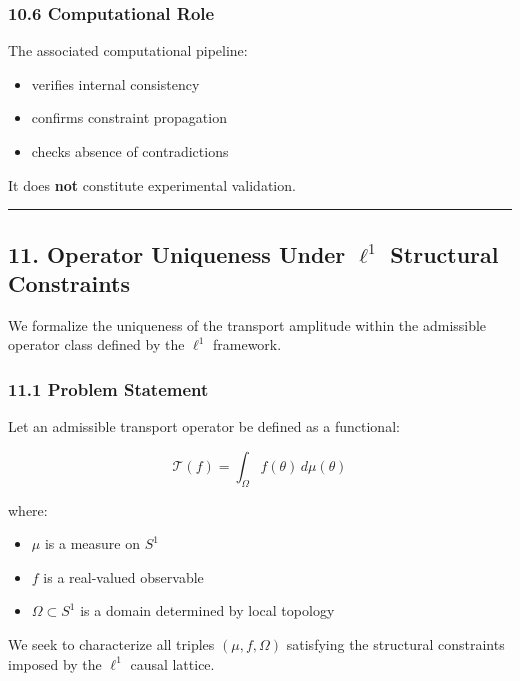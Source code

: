 \documentclass[
]{article}
\providecommand{\tightlist}{%
  \setlength{\itemsep}{0pt}\setlength{\parskip}{0pt}}
\begin{document}
\subsubsection{10.6 Computational Role}\label{computational-role}

The associated computational pipeline:

\begin{itemize}
\tightlist
\item
  verifies internal consistency
\item
  confirms constraint propagation
\item
  checks absence of contradictions
\end{itemize}

It does \textbf{not} constitute experimental validation.

\begin{center}\rule{0.5\linewidth}{0.5pt}\end{center}

\subsection{\texorpdfstring{11. Operator Uniqueness Under \(\ell^1\)
Structural
Constraints}{11. Operator Uniqueness Under \textbackslash ell\^{}1 Structural Constraints}}\label{operator-uniqueness-under-ell1-structural-constraints}

We formalize the uniqueness of the transport amplitude within the
admissible operator class defined by the \(\ell^1\) framework.

\subsubsection{11.1 Problem Statement}\label{problem-statement}

Let an admissible transport operator be defined as a functional:

\[
\mathcal{T}(f) = \int_{\Omega} f(\theta) \, d\mu(\theta)
\]

where:

\begin{itemize}
\tightlist
\item
  \(\mu\) is a measure on \(S^1\)
\item
  \(f\) is a real-valued observable
\item
  \(\Omega \subset S^1\) is a domain determined by local topology
\end{itemize}

We seek to characterize all triples \((\mu, f, \Omega)\) satisfying the
structural constraints imposed by the \(\ell^1\) causal lattice.
\end{document}
